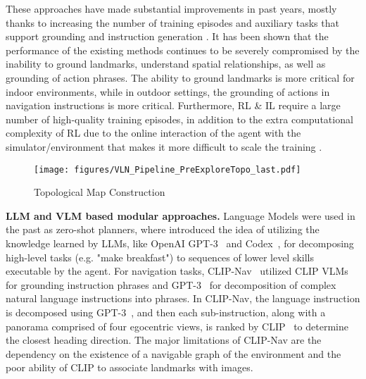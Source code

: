 These approaches have made substantial improvements in past years, mostly thanks to increasing the number of training episodes and auxiliary tasks that support grounding \cite{wang2022lessismore} and instruction generation \cite{fried2018speaker, kamath2023marval}. It has been shown \cite{zhu2021diagnosing} that the performance of the existing methods continues to be severely compromised by the inability to ground landmarks, understand spatial relationships, as well as grounding of action phrases. The ability to ground landmarks is more critical for indoor environments, while in outdoor settings, the grounding of actions in navigation instructions is more critical.
Furthermore, RL \& IL require a large number of high-quality training episodes, in addition to the extra computational complexity of RL due to the online interaction of the agent with the simulator/environment that makes it more difficult to scale the training \cite{kamath2023marval}.\\
%
\begin{figure*}[!h]
  \centering
  \texttt{[image: figures/VLN\_Pipeline\_PreExploreTopo\_last.pdf]}
  \caption{Topological Map Construction}
  \label{fig:vlntopo}
\end{figure*}
%
\noindent
\textbf{LLM and VLM based modular approaches.} Language Models were used in the past as zero-shot planners, where  \cite{huang2022lmzeroshotplanners} introduced the idea of utilizing the knowledge learned by LLMs, like OpenAI GPT-3~\cite{brown2020gpt3} and Codex~\cite{chen2021codex}, for decomposing high-level tasks (e.g. "make breakfast") to sequences of lower level skills executable by the agent. For navigation tasks, CLIP-Nav~\cite{clip-nav} utilized CLIP VLMs~\cite{clip} for grounding instruction phrases and GPT-3~\cite{brown2020gpt3} for decomposition of complex natural language instructions into phrases. In CLIP-Nav, the language instruction is decomposed using GPT-3~\cite{brown2020gpt3}, and then each sub-instruction, along with a panorama comprised of four egocentric views, is ranked by CLIP~\cite{clip} to determine the closest heading direction. The major limitations of CLIP-Nav are the dependency on the existence of a navigable graph of the environment and the poor ability of CLIP to associate landmarks with images. 
